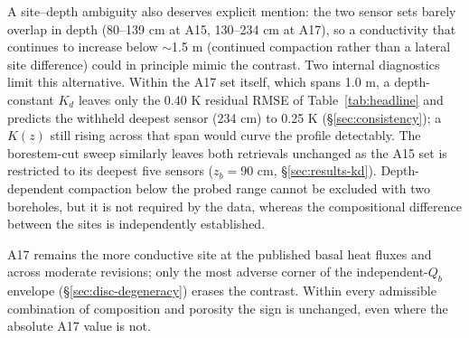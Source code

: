 \documentclass[11pt]{article}
\begin{document}
A site--depth ambiguity also deserves explicit mention: the two
sensor sets barely overlap in depth (80--139 cm at A15, 130--234 cm at
A17), so a conductivity that continues to increase below
$\sim$1.5 m (continued compaction rather than a lateral site
difference) could in principle mimic the contrast. Two internal
diagnostics limit this alternative. Within the A17 set itself, which
spans 1.0 m, a depth-constant $K_d$ leaves only the 0.40 K residual
RMSE of Table~\ref{tab:headline} and predicts the withheld deepest
sensor (234 cm) to 0.25 K (\S\ref{sec:consistency}); a $K(z)$ still
rising across that span would curve the profile detectably. The
borestem-cut sweep similarly leaves both retrievals unchanged as the
A15 set is restricted to its deepest five sensors ($z_b=90$ cm,
\S\ref{sec:results-kd}). Depth-dependent compaction below the probed
range cannot be excluded with two boreholes, but it is not required by
the data, whereas the compositional difference between the sites is
independently established.

A17 remains the more conductive site at the
published basal heat fluxes and across moderate revisions; only the
most adverse corner of the independent-$Q_b$ envelope
(\S\ref{sec:disc-degeneracy}) erases the contrast. Within every
admissible combination of composition and porosity the sign is
unchanged, even where the absolute A17 value is not.

\FloatBarrier
\end{document}
